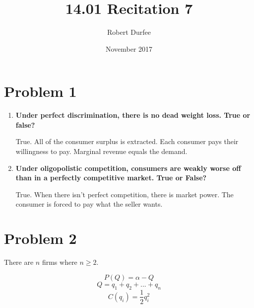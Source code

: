 \documentclass{article}
\title{14.01 Recitation 7}
\author{Robert Durfee}
\date{November 2017}
\begin{document}
\maketitle

\section*{Problem 1}

\begin{enumerate}
    \item \textbf{Under perfect discrimination, there is no dead weight loss.
            True or false?}
    
    True. All of the consumer surplus is extracted. Each consumer pays their
    willingness to pay. Marginal revenue equals the demand.
    
    \item \textbf{Under oligopolistic competition, consumers are weakly worse
            off than in a perfectly competitive market. True or False?}
    
    True. When there isn't perfect competition, there is market power. The
    consumer is forced to pay what the seller wants.
    
\end{enumerate}

\section*{Problem 2}

There are $n$ firms where $n \geq 2$. 

$$P(Q)=\alpha-Q$$
$$Q=q_{1}+q_{2}+...+q_{n}$$
$$C(q_{i})=\frac{1}{2}q_{i}^{2}$$
\end{document}
